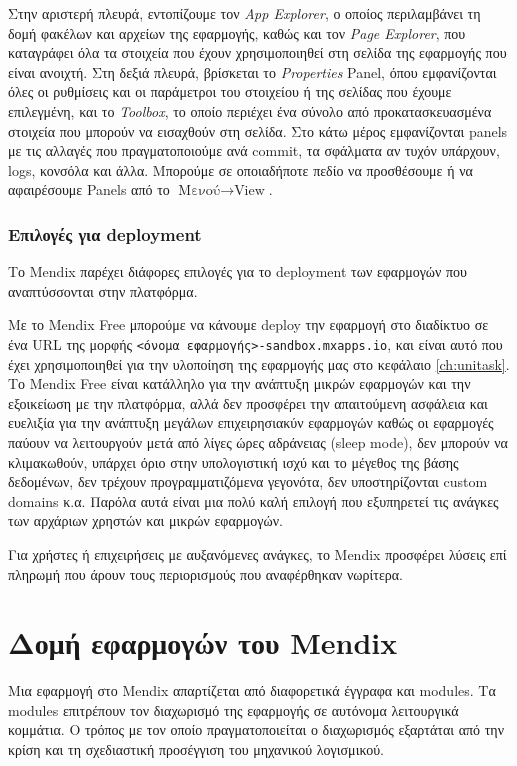         Στην αριστερή πλευρά, εντοπίζουμε τον \textit{App Explorer}, ο οποίος περιλαμβάνει τη δομή φακέλων και αρχείων της εφαρμογής, καθώς και τον \textit{Page Explorer}, που καταγράφει όλα τα στοιχεία που έχουν χρησιμοποιηθεί στη σελίδα της εφαρμογής που είναι ανοιχτή. Στη δεξιά πλευρά, βρίσκεται το \textit{Properties} Panel, όπου εμφανίζονται όλες οι ρυθμίσεις και οι παράμετροι του στοιχείου ή της σελίδας που έχουμε επιλεγμένη, και το \textit{Toolbox}, το οποίο περιέχει ένα σύνολο από προκατασκευασμένα στοιχεία που μπορούν να εισαχθούν στη σελίδα. Στο κάτω μέρος εμφανίζονται panels με τις αλλαγές που πραγματοποιούμε ανά commit, τα σφάλματα αν τυχόν υπάρχουν, logs, κονσόλα και άλλα. Μπορούμε σε οποιαδήποτε πεδίο να προσθέσουμε ή να αφαιρέσουμε Panels από το $ \text{Μενού} \rightarrow \text{View} $. \cite{mendixDoc}

        \subsubsection{Επιλογές για deployment} \label{sec:MendixDeployment}
            Το Mendix παρέχει διάφορες επιλογές για το deployment των εφαρμογών που αναπτύσσονται στην πλατφόρμα.

            Με το Mendix Free μπορούμε να κάνουμε deploy την εφαρμογή στο διαδίκτυο σε ένα URL της μορφής \texttt{<όνομα εφαρμογής>-sandbox.mxapps.io}, και είναι αυτό που έχει χρησιμοποιηθεί για την υλοποίηση της εφαρμογής μας στο κεφάλαιο \ref{ch:unitask}. Το Mendix Free είναι κατάλληλο για την ανάπτυξη μικρών εφαρμογών και την εξοικείωση με την πλατφόρμα, αλλά δεν προσφέρει την απαιτούμενη ασφάλεια και ευελιξία για την ανάπτυξη μεγάλων επιχειρησιακύν εφαρμογών καθώς οι εφαρμογές παύουν να λειτουργούν μετά από λίγες ώρες αδράνειας (sleep mode), δεν μπορούν να κλιμακωθούν, υπάρχει όριο στην υπολογιστική ισχύ και το μέγεθος της βάσης δεδομένων, δεν τρέχουν προγραμματιζόμενα γεγονότα, δεν υποστηρίζονται custom domains κ.α. Παρόλα αυτά είναι μια πολύ καλή επιλογή που εξυπηρετεί τις ανάγκες των αρχάριων χρηστών και μικρών εφαρμογών. \cite{mendixCloud}

            Για χρήστες ή επιχειρήσεις με αυξανόμενες ανάγκες, το Mendix προσφέρει λύσεις επί πληρωμή που άρουν τους περιορισμούς που αναφέρθηκαν νωρίτερα.


    \section{Δομή εφαρμογών του Mendix}
        Μια εφαρμογή στο Mendix απαρτίζεται από διαφορετικά έγγραφα και modules. Τα modules επιτρέπουν τον διαχωρισμό της εφαρμογής σε αυτόνομα λειτουργικά κομμάτια. Ο τρόπος με τον οποίο πραγματοποιείται ο διαχωρισμός εξαρτάται από την κρίση και τη σχεδιαστική προσέγγιση του μηχανικού λογισμικού.

